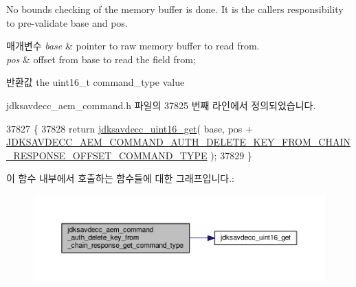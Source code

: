 No bounds checking of the memory buffer is done. It is the caller\textquotesingle{}s responsibility to pre-\/validate base and pos.


\begin{DoxyParams}{매개변수}
{\em base} & pointer to raw memory buffer to read from. \\
\hline
{\em pos} & offset from base to read the field from; \\
\hline
\end{DoxyParams}
\begin{DoxyReturn}{반환값}
the uint16\+\_\+t command\+\_\+type value 
\end{DoxyReturn}


jdksavdecc\+\_\+aem\+\_\+command.\+h 파일의 37825 번째 라인에서 정의되었습니다.


\begin{DoxyCode}
37827 \{
37828     \textcolor{keywordflow}{return} \hyperlink{group__endian_ga3fbbbc20be954aa61e039872965b0dc9}{jdksavdecc\_uint16\_get}( base, pos + 
      \hyperlink{group__command__auth__delete__key__from__chain__response_ga60f8943635f83e472fc1d983674b0e5e}{JDKSAVDECC\_AEM\_COMMAND\_AUTH\_DELETE\_KEY\_FROM\_CHAIN\_RESPONSE\_OFFSET\_COMMAND\_TYPE}
       );
37829 \}
\end{DoxyCode}


이 함수 내부에서 호출하는 함수들에 대한 그래프입니다.\+:
\nopagebreak
\begin{figure}[H]
\begin{center}
\leavevmode
\includegraphics[width=350pt]{group__command__auth__delete__key__from__chain__response_ga8a309053585a67255da3c748b330f2e5_cgraph}
\end{center}
\end{figure}


